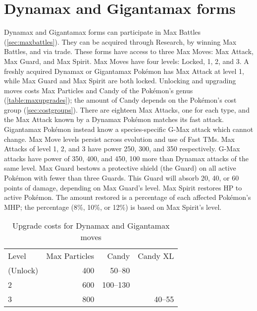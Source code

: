 \section{Dynamax and Gigantamax forms}
\label{sec:dmaxgmax}
Dynamax and Gigantamax forms can participate in Max Battles (\autoref{sec:maxbattles}).
They can be acquired through Research, by winning Max Battles, and via trade.
These forms have access to three Max Moves: Max Attack, Max Guard, and Max Spirit.
Max Moves have four levels: Locked, 1, 2, and 3.
A freshly acquired Dynamax or Gigantamax Pokémon has Max Attack at level 1, while Max Guard and Max Spirit are both locked.
Unlocking and upgrading moves costs Max Particles and Candy of the Pokémon's genus (\autoref{table:maxupgrades});
 the amount of Candy depends on the Pokémon's cost group (\autoref{sec:costgroups}).
There are eighteen Max Attacks, one for each type, and the Max Attack known by a Dynamax Pokémon matches its fast attack.
Gigantamax Pokémon instead know a species-specific G-Max attack which cannot change.
Max Move levels persist across evolution and use of Fast TMs.
Max Attacks of level 1, 2, and 3 have power 250, 300, and 350
  respectively.
G-Max attacks have power of 350, 400, and 450, 100 more than Dynamax attacks of the same level.
Max Guard bestows a protective shield (the Guard) on all active Pokémon
  with fewer than three Guards.
This Guard will absorb 20, 40, or 60 points of damage, depending on Max Guard's level.
Max Spirit restores HP to active Pokémon.
The amount restored is a percentage of each affected Pokémon's MHP;
  the percentage (8\%, 10\%, or 12\%) is based on Max Spirit's level.
\begin{table}
\centering
\begin{tabular}{lrrr}
  Level & Max Particles & Candy & Candy XL\\
  \Midrule
  1 (Unlock) & 400 & 50--80 &\\
  2          & 600 & 100--130 &\\
  3          & 800 & & 40--55\\
\end{tabular}
\caption{Upgrade costs for Dynamax and Gigantamax moves}
\label{table:maxupgrades}
\end{table}


\clearpage
